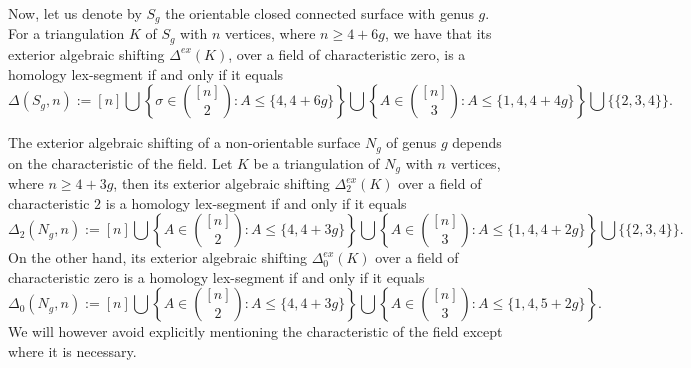 \documentclass[reqno,english]{amsart}
\numberwithin{claimcounter}{theorem}
\theoremstyle{remark}
\theoremstyle{definition}
\numberwithin{theorem}{section}
\newcommand{\exshift}[1]{\Delta^{ex}(#1)}
\begin{document}
Now, let us denote by $S_g$ the orientable closed connected surface with genus $g$. For a triangulation $K$ of $S_g$ with $n$ vertices, where $n\ge 4+6g$, we have that its exterior algebraic shifting
$\exshift K$, over a field of characteristic zero,
is a homology lex-segment if and only if it equals 
$$\Delta(S_g, n):= [n] \bigcup \left \{\sigma\in \binom{[n]}{2}\colon A \leq \{4,4+6g\} \right \} \bigcup \left \{ A \in \binom{[n]}{3} \colon A \leq \{1,4,4+4g\} \right \} \bigcup \{\{2,3,4\}\}.$$

The exterior algebraic shifting of a non-orientable surface $N_g$ of genus $g$ depends on the characteristic of the field.
Let $K$ be a triangulation of $N_g$ with $n$ vertices, where $n\geq 4+3g$, then its exterior algebraic shifting $\Delta^{ex}_2(K)$ over a field of characteristic $2$ is a homology lex-segment if and only if it equals
$$\Delta_2(N_g, n):= [n] \bigcup \left \{A \in \binom{[n]}{2}\colon A \leq \{4,4+3g\} \right \} \bigcup \left \{ A \in \binom{[n]}{3} \colon A \leq \{1,4,4+2g\} \right \} \bigcup \{\{2,3,4\}\}.$$
On the other hand, its exterior algebraic shifting 
$\Delta_0^{ex}(K)$ over a field of characteristic zero
is a homology lex-segment if and only if it equals
$$\Delta_0(N_g, n):= [n] \bigcup \left \{A\in \binom{[n]}{2}\colon A \leq \{4,4+3g\} \right \} \bigcup \left \{ A\in \binom{[n]}{3} \colon A \leq \{1,4,5+2g\} \right \}.$$
We will however avoid explicitly mentioning the characteristic of the field except where it is necessary.
\end{document}
